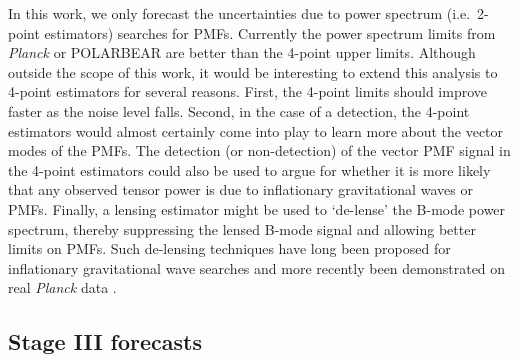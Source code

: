 \documentclass[apj]{emulateapj}
\newcommand{\apmf}{\ensuremath{A_{\rm pmf}}}
\newcommand{\lcdm}{\ensuremath{\Lambda}CDM}
\newcommand{\planck}{{\sl Planck}}
\newcommand{\pb}{POLARBEAR}
\newcommand{\tbd}[1]{\textcolor{Red}{{\bf TBD}: #1}}
\begin{document}
In this work, we only forecast the uncertainties due to power spectrum (i.e.~2-point estimators) searches for PMFs. 
Currently the power spectrum limits from \planck{} or \pb{} are better than the 4-point upper limits. 
Although outside the scope of this work, it would be interesting to extend this analysis to 4-point estimators for several reasons. 
First, the 4-point limits should improve faster as the noise level falls. 
Second, in the case of a detection, the 4-point estimators would almost certainly come into play to learn more about the vector modes of the PMFs. 
The detection (or non-detection) of the vector PMF signal in the 4-point estimators could also be used to argue for whether it is more likely that any observed tensor power is due to  inflationary gravitational waves or  PMFs. 
Finally, a lensing estimator might be used to `de-lense' the B-mode power spectrum, thereby suppressing the lensed B-mode signal and allowing better limits on PMFs. 
Such de-lensing techniques have long been proposed for inflationary gravitational wave searches \citep[e.g.][]{knox02,kesden02,seljak04a,simard15} and more recently been demonstrated on real \planck{} data \citep{larsen16}. 


\subsection{Stage III forecasts}
\end{document}
